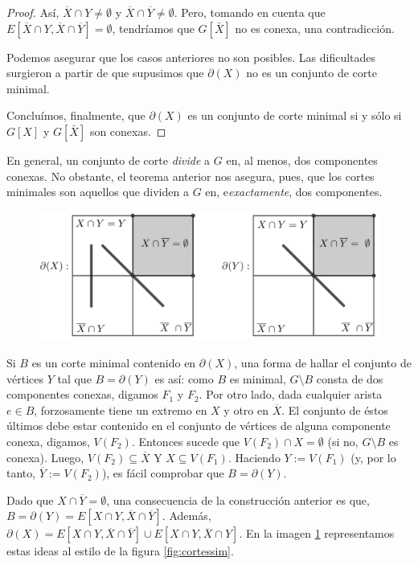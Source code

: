 \begin{proof}
Así, $\overline{X} \cap Y \neq \emptyset$ y $\overline{X} \cap \overline{Y} \neq \emptyset$. Pero, tomando en cuenta que $E[\overline{X} \cap Y, \overline{X} \cap \overline{Y}] = \emptyset$, tendríamos que $G[\bar{X}]$ no es conexa, una contradicción.

Podemos asegurar que los casos anteriores no son posibles. Las dificultades surgieron a partir de que supusimos que $\partial(X)$ no es un conjunto de corte minimal.

Concluímos, finalmente, que $\partial(X)$ es un conjunto de corte minimal si y sólo si $G[X]$ y $G[\bar{X}]$ son conexas. 

\end{proof}

En general, un conjunto de corte \textit{divide} a $G$ en, al menos, dos componentes conexas. No obstante, el teorema anterior nos asegura, pues, que los cortes minimales son aquellos que dividen a $G$ en, e\textit{exactamente}, dos componentes.

\begin{figure}[H]
    \centering
    \includegraphics[scale=0.2]{img/imgchapter2/bondvertices.jpg}
    \caption{}
    \label{fig:bondvertices}
\end{figure}
Si $B$ es un corte minimal contenido en $\partial(X)$, una forma de hallar el conjunto de vértices $Y$ tal que $B = \partial(Y)$ es así: como $B$ es minimal, $G\setminus B$ consta de dos componentes conexas, digamos $F_{1}$ y $F_{2}$. Por otro lado, dada cualquier arista $e \in B$, forzosamente tiene un extremo en $X$ y otro en $\overline{X}$. El conjunto de éstos últimos debe estar contenido en el conjunto de vértices de alguna componente conexa, digamos, $V(F_{2})$. Entonces sucede que $V(F_{2})\cap X = \emptyset$ (si no, $G\setminus B$ es conexa). Luego, $V(F_{2})\subseteq \overline{X}$ Y $X \subseteq V(F_{1})$. Haciendo $Y:=V(F_{1})$ (y, por lo tanto, $\overline{Y}:=V(F_{2})$), es fácil comprobar que $B = \partial(Y)$.

Dado que $X \cap \overline{Y} = \emptyset$, una consecuencia de la construcción anterior es que,  $B = \partial(Y) = E[X\cap Y, \overline{X} \cap \overline{Y}]$. Además, $\partial(X) = E[X\cap Y, \overline{X} \cap \overline{Y}] \cup E[X \cap Y, \overline{X} \cap Y]$. En la imagen \ref{fig:bondvertices} representamos estas ideas al estilo de la figura \ref{fig:cortessim}.

